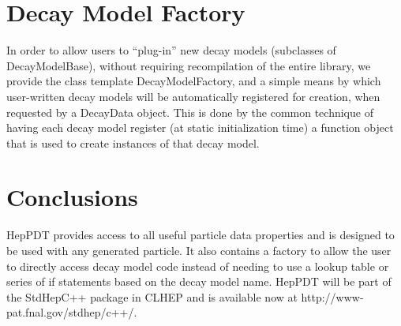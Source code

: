 \section{Decay Model Factory}

In order to allow users to ``plug-in'' new decay models
(subclasses of DecayModelBase), without requiring recompilation of
the entire library, we provide the class template
DecayModelFactory, and a simple means by which user-written decay
models will be automatically registered for creation, when
requested by a DecayData object. This is done by the common
technique of having each decay model register (at static
initialization time) a function object that is used to create
instances of that decay model.

\section{Conclusions}

HepPDT provides access to all useful particle data properties
and is designed to be used with any generated particle.    
It also contains
a factory to allow the user to directly access decay model code
instead of needing to use a lookup table or series of if
statements based on the decay model name.  HepPDT will be part of the
StdHepC++ package in CLHEP\cite{clhep} and is available now at 
http://www-pat.fnal.gov/stdhep/c++/.

